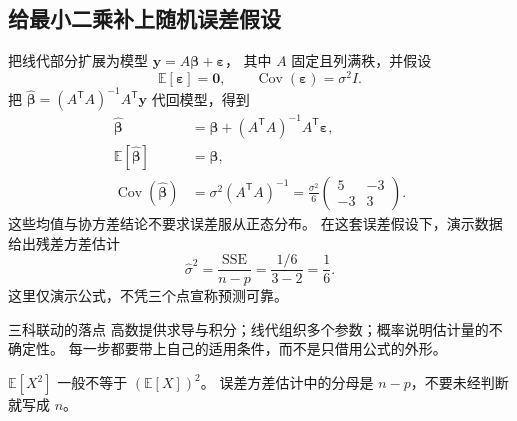 \documentclass[UTF8,11pt,a4paper,oneside,openany,linespread=1]{ctexbook}
\newcommand{\E}{\mathbb{E}}
\DeclareMathOperator{\Cov}{Cov}
\numberwithin{equation}{chapter}
\begin{document}
\subsection{给最小二乘补上随机误差假设}
把线代部分扩展为模型 \(\bm{y}=A\bm{\beta}+\bm{\varepsilon}\)，
其中 \(A\) 固定且列满秩，并假设
\[
  \E[\bm{\varepsilon}]=\bm0,\qquad
  \Cov(\bm{\varepsilon})=\sigma^2 I.
\]
把 \(\widehat{\bm{\beta}}=(A^{\mathsf T}A)^{-1}A^{\mathsf T}\bm{y}\) 代回模型，得到
\begin{align*}
  \widehat{\bm{\beta}}
    &=\bm{\beta}+(A^{\mathsf T}A)^{-1}A^{\mathsf T}\bm{\varepsilon},\\
  \E[\widehat{\bm{\beta}}]&=\bm{\beta},\\
  \Cov(\widehat{\bm{\beta}})&=\sigma^2(A^{\mathsf T}A)^{-1}
    =\frac{\sigma^2}{6}\begin{pmatrix}5&-3\\-3&3\end{pmatrix}.
\end{align*}
这些均值与协方差结论不要求误差服从正态分布。
在这套误差假设下，演示数据给出残差方差估计
\[
  \widehat{\sigma}^2=\frac{\mathrm{SSE}}{n-p}
  =\frac{1/6}{3-2}=\frac16.
\]
这里仅演示公式，不凭三个点宣称预测可靠。

\begin{methodbox}{三科联动的落点}
高数提供求导与积分；线代组织多个参数；概率说明估计量的不确定性。
每一步都要带上自己的适用条件，而不是只借用公式的外形。
\end{methodbox}
\begin{pitfallbox}
\(\E[X^2]\) 一般不等于 \((\E[X])^2\)。
误差方差估计中的分母是 \(n-p\)，不要未经判断就写成 \(n\)。
\end{pitfallbox}
\end{document}
